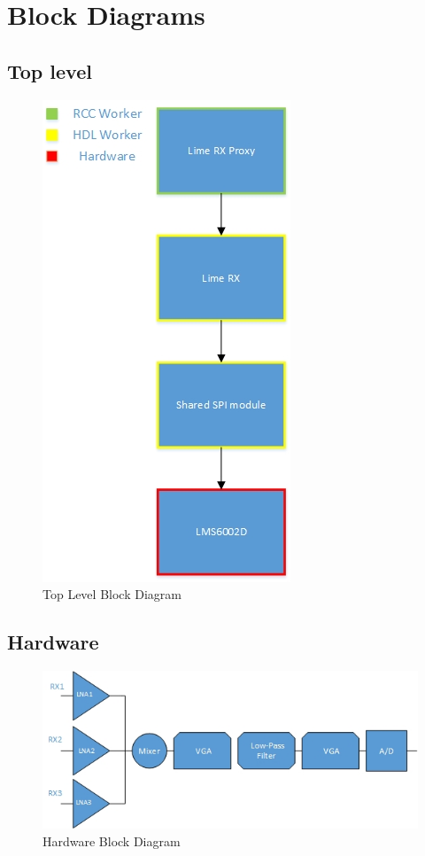 \documentclass{article}
\begin{document}
\section*{Block Diagrams}
\subsection*{Top level}
\begin{figure}[ht]
	\centerline{\includegraphics[scale=0.7]{lime_RX_toplevel}}
	\caption{Top Level Block Diagram}
	\label{fig:top}
\end{figure}
\vspace{25 mm}

\subsection*{Hardware}
\begin{figure}[ht]
	\centerline{\includegraphics[scale=0.7]{lime_RX_HW}}
	\caption{Hardware Block Diagram}
	\label{fig:hw}
\end{figure}
\vspace{25 mm}
\end{document}
